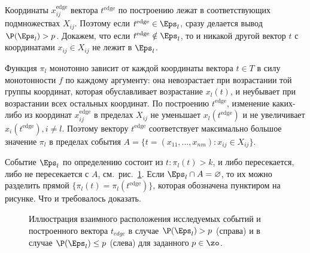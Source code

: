 Координаты $x_{ij}^\text{edge}$ вектора $t^\text{edge}$ по построению лежат в соответствующих подмножествах $X_{ij}$. Поэтому если $t^\text{edge} \in \Eps_l$, сразу делается вывод $\P(\Eps_l) > p$. Докажем, что если $t^\text{edge} \notin \Eps_l$, то и никакой другой вектор $t$ с координатами $x_{ij} \in X_{ij}$ не лежит в $\Eps_l$. 

Функция $\pi_l$ монотонно зависит от каждой координаты вектора $t \in T$ в силу монотонности $f$ по каждому аргументу: она невозрастает при возрастании той группы координат, которая обуславливает возрастание $x_l(t)$, и неубывает при возрастании всех остальных координат. По построению $t^\text{edge}$, изменение каких-либо из координат $x_{ij}^\text{edge}$ в пределах $X_{ij}$ не уменьшает $x_l(t^\text{edge})$ и не увеличивает $x_i(t^\text{edge}), i \neq l$. Поэтому вектору $t^\text{edge}$ соответствует максимально большое значение $\pi_l$ в пределах события $A = \{t = (x_{11}, ..., x_{nm}): x_{ij} \in X_{ij}\}$.

Событие $\Eps_l$ по определению состоит из $t: \pi_l(t) > k$, и либо пересекается, либо не пересекается с $A$, см.~рис.~\ref{ris:algo_sets}. Если $\Eps_l \cap A = \varnothing$, то их можно разделить прямой $\{\pi_l(t) = \pi_l(t^\text{edge})\}$, которая обозначена пунктиром на рисунке. Что и требовалось доказать.

\begin{figure}[h!]
\caption{\small Иллюстрация взаимного расположения исследуемых событий и построенного вектора $t_{edge}$ в случае $\P(\Eps_l) > p$ (справа) и в случае $\P(\Eps_l) \leq p$ (слева) для заданного $p \in \zo$.}
\label{ris:algo_sets}
\end{figure}

